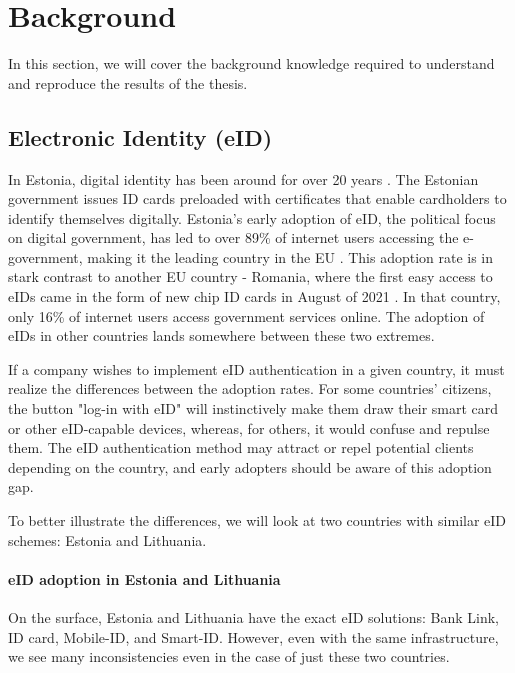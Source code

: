 \section{Background}

In this section, we will cover the background knowledge required to understand and reproduce the results of the thesis.

\subsection{Electronic Identity (eID)}

In Estonia, digital identity has been around for over 20 years \cite{eelaw-idcard}. The Estonian government issues ID cards preloaded with certificates that enable cardholders to identify themselves digitally. Estonia's early adoption of eID, the political focus on digital government, has led to over 89\% of internet users accessing the e-government, making it the leading country in the EU \cite{eu-desi}. This adoption rate is in stark contrast to another EU country - Romania, where the first easy access to eIDs came in the form of new chip ID cards in August of 2021 \cite{romania-adopts-eid}. In that country, only 16\% of internet users access government services online. The adoption of eIDs in other countries lands somewhere between these two extremes.

If a company wishes to implement eID authentication in a given country, it must realize the differences between the adoption rates. For some countries' citizens, the button "log-in with eID" will instinctively make them draw their smart card or other eID-capable devices, whereas, for others, it would confuse and repulse them. The eID authentication method may attract or repel potential clients depending on the country, and early adopters should be aware of this adoption gap.

To better illustrate the differences, we will look at two countries with similar eID schemes: Estonia and Lithuania.

\paragraph{eID adoption in Estonia and Lithuania}

On the surface, Estonia and Lithuania have the exact eID solutions: Bank Link, ID card, Mobile-ID, and Smart-ID. However, even with the same infrastructure, we see many inconsistencies even in the case of just these two countries.

